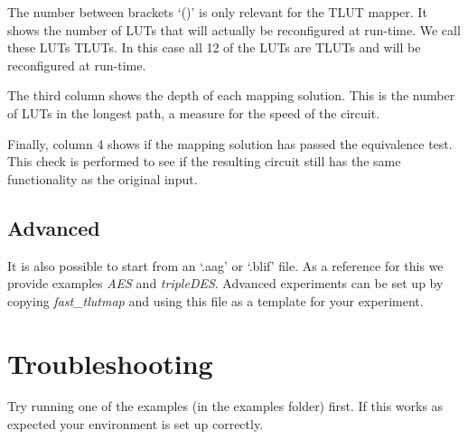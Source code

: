 \documentclass[a4paper,oneside]{memoir}
\begin{document}
\begin{enumerate}
The number between brackets `()' is only relevant for the TLUT mapper. It shows the number of LUTs that will actually be reconfigured at run-time. We call these LUTs TLUTs. In this case all 12 of the LUTs are TLUTs and will be reconfigured at run-time.

The third column shows the depth of each mapping solution. This is the number of LUTs in the longest path, a measure for the speed of the circuit. 

Finally, column 4 shows if the mapping solution has passed the equivalence test. This check is performed to see if the resulting circuit still has the same functionality as the original input.


\end{enumerate}

\section{Advanced}
It is also possible to start from an `.aag' or `.blif' file. As a reference for this we provide examples \emph{AES} and \emph{tripleDES}. 
Advanced experiments can be set up by copying \emph{fast\_tlutmap} and using this file as a template for your experiment.

\clearpage
\chapter{Troubleshooting}\label{sec:troubleshooting}
Try running one of the examples (in the examples folder) first. If this works as expected your environment is set up correctly.\\
\end{document}
